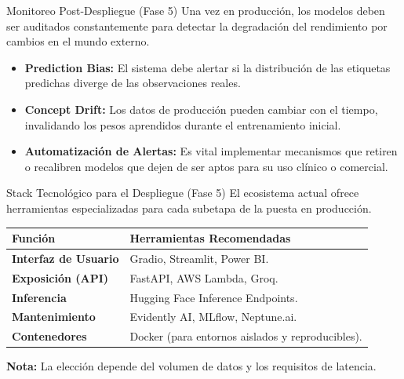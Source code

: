 \documentclass{beamer}
\begin{document}
	\begin{frame}{Monitoreo Post-Despliegue (Fase 5)}
		Una vez en producción, los modelos deben ser auditados constantemente para detectar la degradación del rendimiento por cambios en el mundo externo.
		
		\begin{itemize}
			\item<2-> \textbf{Prediction Bias:} El sistema debe alertar si la distribución de las etiquetas predichas diverge de las observaciones reales.
			\item<3-> \textbf{Concept Drift:} Los datos de producción pueden cambiar con el tiempo, invalidando los pesos aprendidos durante el entrenamiento inicial.
			\item<4-> \textbf{Automatización de Alertas:} Es vital implementar mecanismos que retiren o recalibren modelos que dejen de ser aptos para su uso clínico o comercial.
		\end{itemize}
	\end{frame}
	
	\begin{frame}{Stack Tecnológico para el Despliegue (Fase 5)}
		El ecosistema actual ofrece herramientas especializadas para cada subetapa de la puesta en producción.
		
		\begin{table}[]
			\tiny
			\centering
			\begin{tabular}{@{}ll@{}}
				\toprule
				\textbf{Función} & \textbf{Herramientas Recomendadas} \\ \midrule
				\textbf{Interfaz de Usuario} & Gradio, Streamlit, Power BI. \\
				\textbf{Exposición (API)} & FastAPI, AWS Lambda, Groq. \\
				\textbf{Inferencia} & Hugging Face Inference Endpoints. \\
				\textbf{Mantenimiento} & Evidently AI, MLflow, Neptune.ai. \\
				\textbf{Contenedores} & Docker (para entornos aislados y reproducibles). \\ \bottomrule
			\end{tabular}
		\end{table}
		\textbf{Nota:} La elección depende del volumen de datos y los requisitos de latencia.
	\end{frame}
	
\end{document}
